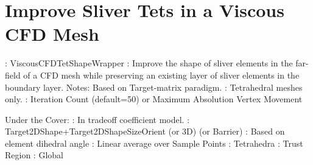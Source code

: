 \section{Improve Sliver Tets in a Viscous CFD Mesh} \label{sec:ViscousCFDTetShapeWrapper}

: ViscousCFDTetShapeWrapper \newline
{}: Improve the shape of sliver elements in the far-field 
of a CFD mesh while 
preserving an existing layer of sliver elements in the boundary layer. \newline
\noindent Notes: Based on Target-matrix paradigm.  \newline
{}: Tetrahedral meshes only.  \newline 
{}: Iteration Count (default=50) or Maximum Absolution Vertex Movement \newline \newline
 
\noindent Under the Cover: \newline
{}: In tradeoff coefficient model. \newline
{}: Target2DShape+Target2DShapeSizeOrient (or 3D) (or Barrier) \newline
{}: Based on element dihedral angle \newline
{}: Linear average over Sample Points \newline
{}: Tetrahedra \newline
{}: Trust Region \newline
{}: Global \newline


